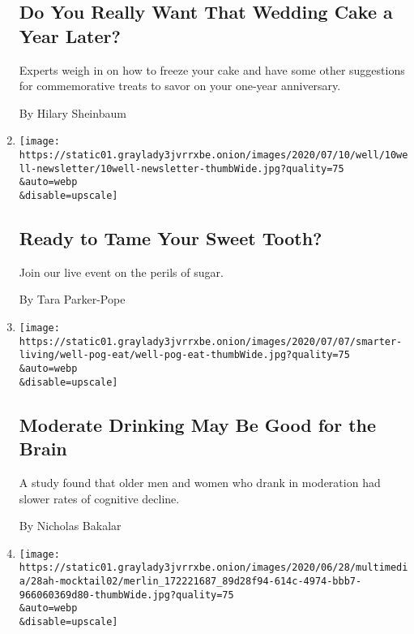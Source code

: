 \begin{enumerate}
{  \subsection{Do You Really Want That Wedding Cake a Year
  Later?}\label{do-you-really-want-that-wedding-cake-a-year-later}}

  Experts weigh in on how to freeze your cake and have some other
  suggestions for commemorative treats to savor on your one-year
  anniversary.

  By Hilary Sheinbaum
\item
  \href{/2020/07/09/well/eat/ready-to-tame-your-sweet-tooth.html}{}

  \texttt{[image: https://static01.graylady3jvrrxbe.onion/images/2020/07/10/well/10well-newsletter/10well-newsletter-thumbWide.jpg?quality=75\\\&auto=webp\\\&disable=upscale]}

  \hypertarget{ready-to-tame-your-sweet-tooth}{%
  \subsection{Ready to Tame Your Sweet
  Tooth?}\label{ready-to-tame-your-sweet-tooth}}

  Join our live event on the perils of sugar.

  By Tara Parker-Pope
\item
  \href{/2020/07/02/well/eat/moderate-drinking-study.html}{}

  \texttt{[image: https://static01.graylady3jvrrxbe.onion/images/2020/07/07/smarter-living/well-pog-eat/well-pog-eat-thumbWide.jpg?quality=75\\\&auto=webp\\\&disable=upscale]}

  \hypertarget{moderate-drinking-may-be-good-for-the-brain}{%
  \subsection{Moderate Drinking May Be Good for the
  Brain}\label{moderate-drinking-may-be-good-for-the-brain}}

  A study found that older men and women who drank in moderation had
  slower rates of cognitive decline.

  By Nicholas Bakalar
\item
  \href{/2020/06/27/at-home/coronavirus-make-mocktails.html}{}

  \texttt{[image: https://static01.graylady3jvrrxbe.onion/images/2020/06/28/multimedia/28ah-mocktail02/merlin\_172221687\_89d28f94-614c-4974-bbb7-966060369d80-thumbWide.jpg?quality=75\\\&auto=webp\\\&disable=upscale]}


\end{enumerate}
